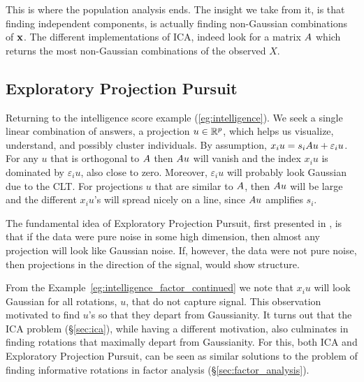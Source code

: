 This is where the population analysis ends. 
The insight we take from it, is that finding independent components, is actually finding non-Gaussian combinations of $\mathbf{x}$. 
The different implementations of ICA, indeed look for a matrix $A$ which returns the most non-Gaussian combinations of the observed $X$. 




\subsection{Exploratory Projection Pursuit}
\label{sec:exploratpory_ppr}


\begin{example}
\label{eg:intelligence_factor_continued}
Returning to the intelligence score example (\ref{eg:intelligence}).
We seek a single linear combination of answers, a projection $u \in \mathbb{R}^p$, which helps us visualize, understand, and possibly cluster individuals. 
By assumption, $x_i u = s_i A u + \varepsilon_i u$.
For any $u$ that is orthogonal to $A$ then $A u$ will vanish and the index $x_i u$ is dominated by $\varepsilon_i u$, also close to zero. Moreover, $\varepsilon_i u$ will probably look Gaussian due to the CLT.
For projections $u$ that are similar to $A$, then $A u$ will be large and the different $x_i u$'s will spread nicely on a line, since $A u$ amplifies $s_i$.
\end{example}


The fundamental idea of Exploratory Projection Pursuit, first presented in \cite{friedman_projection_1974}, is that if the data were pure noise in some high dimension, then almost any projection will look like Gaussian noise. 
If, however, the data were not pure noise, then projections in the direction of the signal, would show structure. 



\begin{remark}
From the Example~\ref{eg:intelligence_factor_continued} we note that $x_i u$ will look Gaussian for all rotations, $u$, that do not capture signal.
This observation motivated \citet{friedman_projection_1974} to find $u$'s so that they depart from Gaussianity. 
It turns out that the ICA problem (\S\ref{sec:ica}), while having a different motivation, also culminates in finding rotations that maximally depart from Gaussianity.
For this, both ICA and Exploratory Projection Pursuit, can be seen as similar solutions to the problem of finding informative rotations in factor analysis (\S\ref{sec:factor_analysis}).
\end{remark}






